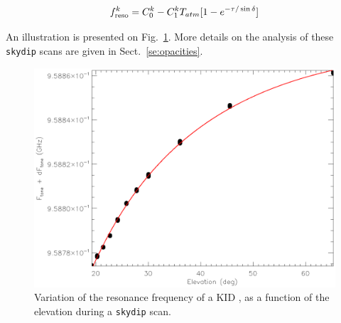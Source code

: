 \begin{equation}
  f_{\rm{reso}}^k  = C_0^k - C_1^k T_{atm}[1-e^{-\tau/\sin\delta}]
\label{eq:skydip_1}
\end{equation}

An illustration is presented on Fig.~\ref{fig:ftone_vs_elev}. More details on
the analysis of these {\tt skydip} scans are given in Sect.~\ref{se:opacities}.

\begin{figure}[ht!]
\begin{center}
  \includegraphics[clip, angle=0, scale=0.75]{Figures/skydip_report.eps}
\caption[skydip]{Variation of the resonance frequency of a KID
  ,  as a function of the
  elevation during a {\tt skydip} scan.}
\label{fig:ftone_vs_elev}
\end{center}
\end{figure}

\subsection{\bms}
\label{se:beammaps}

